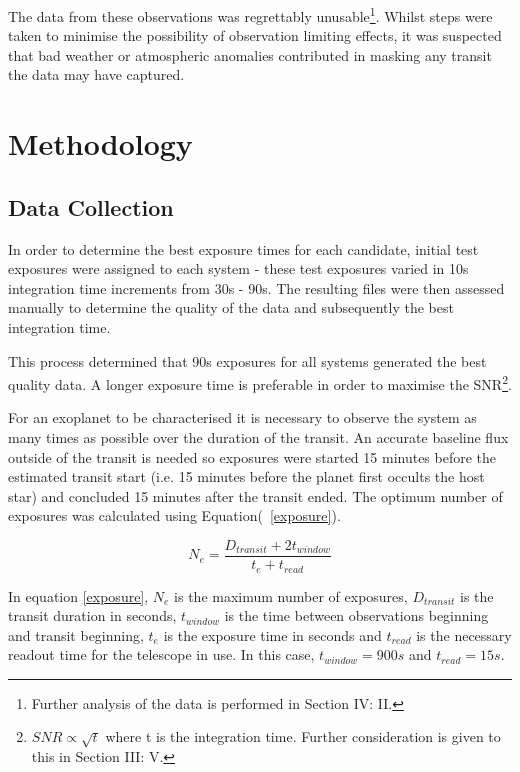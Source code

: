 \documentclass{report}
\begin{document}
The data from these observations was regrettably unusable\footnote{Further analysis of the data is performed in Section IV: II.}. Whilst steps were taken to minimise the possibility of observation limiting effects, it was suspected that bad weather or atmospheric anomalies contributed in masking any transit the data may have captured. 
 

\section{Methodology}
\subsection{Data Collection}
In order to determine the best exposure times for each candidate, initial test exposures
were assigned to each system - these test exposures varied in 10s integration time
increments from 30s - 90s. The resulting files were then assessed manually to determine
the quality of the data and subsequently the best integration time.

This process determined that 90s exposures for all systems generated the best quality
data. A longer exposure time is preferable in order to maximise the SNR\footnote{$SNR 
\propto \sqrt{t}$ where t is the integration time. Further consideration is given to this in Section III: V.}. 

For an exoplanet to be characterised it is necessary to observe the system as many times as possible over the duration of the transit. An accurate baseline flux outside of the transit is needed so exposures were started 15 minutes before the estimated transit start (i.e. 15 minutes before the planet first occults the host star) and concluded 15 minutes after the transit ended. The optimum number of exposures was calculated using Equation(~\ref{exposure}). 

\begin{equation} \label{exposure}
    N_{e} = \frac{D_{transit} + 2t_{window}}{t_{e} + t_{read}}
\end{equation}

In equation \ref{exposure}, $N_{e}$ is the maximum number of exposures, $D_{transit}$ is the transit duration in seconds, $t_{window}$ is the time between observations beginning and transit beginning, $t_{e}$ is the exposure time in seconds and $t_{read}$ is the necessary readout time for the telescope in use. In this case, $t_{window}=900s$ and $t_{read}=15s$.
\end{document}
